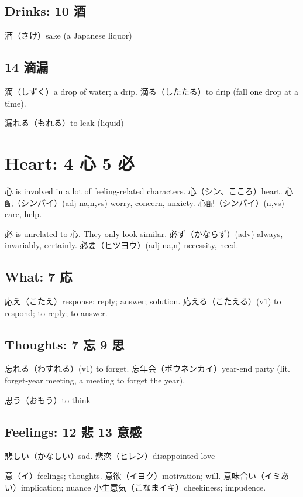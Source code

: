 \subsection{Drinks: 10 酒}

酒（さけ）sake (a Japanese liquor)

\subsection{14 滴漏}

滴（しずく）a drop of water; a drip.
滴る（したたる）to drip (fall one drop at a time).

漏れる（もれる）to leak (liquid)

\section{Heart: 4 心 5 必}

心 is involved in a lot of feeling-related characters.
心（シン、こころ）heart.
心配（シンパイ）(adj-na,n,vs) worry, concern, anxiety.
心配（シンパイ）(n,vs) care, help.

必 is unrelated to 心. They only look similar.
必ず（かならず）(adv) always, invariably, certainly.
必要（ヒツヨウ）(adj-na,n) necessity, need.

\subsection{What: 7 応}

応え（こたえ）response; reply; answer; solution.
応える（こたえる）(v1) to respond; to reply; to answer.

\subsection{Thoughts: 7 忘 9 思}

忘れる（わすれる）(v1) to forget.
忘年会（ボウネンカイ）year-end party
(lit. forget-year meeting, a meeting to forget the year).

思う（おもう）to think

\subsection{Feelings: 12 悲 13 意感}

悲しい（かなしい）sad.
悲恋（ヒレン）disappointed love

意（イ）feelings; thoughts.
意欲（イヨク）motivation; will.
意味合い（イミあい）implication; nuance
小生意気（こなまイキ）cheekiness; impudence.

